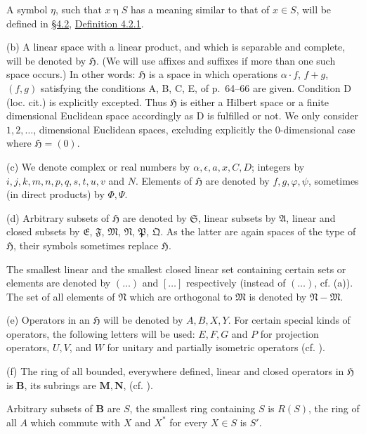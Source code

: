 \documentclass[12pt,b5paper,twoside]{article}
\newcommand{\Hspace}{\mathfrak H}
\newcommand{\M}{\mathbf M}
\newcommand{\N}{\mathbf N}
\newcommand{\B}{\mathbf B}
\newcommand{\secref}[1]{\hyperref[sec:#1]{\S#1}}
\newcommand{\defref}[1]{\hyperref[def:#1]{Definition #1}}
\begin{document}
A symbol $\eta$, such that $x\mathbin{\eta}S$ has a meaning similar to that
of $x\in S$, will be defined in \secref{4.2}, \defref{4.2.1}.

\noindent (b) A linear space with a linear product, and which is separable and
complete, will be denoted by $\Hspace$. (We will use affixes and suffixes if
more than one such space occurs.) In other words: $\Hspace$ is a space in
which operations $\alpha\cdot f$, $f+g$, $(f,g)$ satisfying the conditions
A, B, C, E, of \cite{ref16} p.~64--66 are given. Condition D (loc. cit.) is
explicitly excepted. Thus $\Hspace$ is either a Hilbert space or a finite
dimensional Euclidean space accordingly as D is fulfilled or not. We only
consider $1,2,\ldots$, dimensional Euclidean spaces, excluding explicitly the
0-dimensional case where $\Hspace=(0)$.

\noindent (c) We denote complex or real numbers by
$\alpha,\epsilon,a,x,C,D$; integers by
$i,\allowbreak j,\allowbreak k,\allowbreak m,\allowbreak n,\allowbreak
p,\allowbreak q,\allowbreak s,\allowbreak t,\allowbreak u,\allowbreak v$ and $N$.
Elements of $\Hspace$ are denoted by $f,g,\varphi,\psi$, sometimes (in direct
products) by $\Phi,\Psi$.

\noindent (d) Arbitrary subsets of $\Hspace$ are denoted by $\mathfrak S$,
linear subsets by $\mathfrak A$, linear and closed subsets by
$\mathfrak E$, $\mathfrak F$, $\mathfrak M$, $\mathfrak N$,
$\mathfrak P$, $\mathfrak Q$.
As the latter are again spaces of the type of $\Hspace$, their symbols
sometimes replace $\Hspace$.

The smallest linear and the smallest closed linear set containing certain sets
or elements are denoted by $(\ldots)$ and $[\ldots]$ respectively (instead of
$(\ldots)$, cf. (a)). The set of all elements of $\mathfrak N$ which are
orthogonal to $\mathfrak M$ is denoted by $\mathfrak N-\mathfrak M$.

\noindent (e) Operators in an $\Hspace$ will be denoted by $A,B,X,Y$. For
certain special kinds of operators, the following letters will be used:
$E,F,G$ and $P$ for projection operators, $U,V$, and $W$ for unitary and
partially isometric operators (cf. \cite[p.~70]{ref16}).

\noindent (f) The ring of all bounded, everywhere defined, linear and closed
operators in $\Hspace$ is $\B$, its subrings are $\M,\N$, (cf.
\cite[p.~388]{ref18}).

Arbitrary subsets of $\B$ are $S$, the smallest ring containing $S$ is
$R(S)$, the ring of all $A$ which commute with $X$ and $X^*$ for every
$X\in S$ is $S'$.
\end{document}
